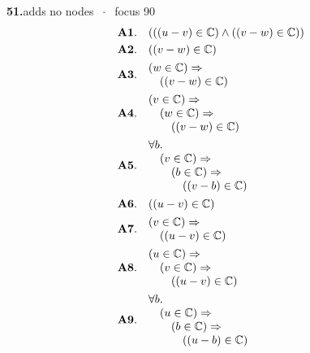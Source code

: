\documentclass[11pt]{article}
\theoremstyle{plain}
\newcommand{\fit}[1]{\resizebox{\ifdim\width>\linewidth\linewidth\else\width\fi}{!}{#1}}
\begin{document}
\medskip\noindent\textbf{51.}\quad \fit{\texttt{(ass)}}\hfill{\small adds no nodes $\;\cdot\;$ focus 90}\\[2pt]
\begin{align*}
  \mathbf{A1.}\quad & (((u - v) \in \mathbb{C}) \wedge ((v - w) \in \mathbb{C})) \\
  \mathbf{A2.}\quad & ((v - w) \in \mathbb{C}) \\
  \mathbf{A3.}\quad & \begin{array}{@{}l@{}} (w \in \mathbb{C}) \Rightarrow  \\ \quad ((v - w) \in \mathbb{C}) \end{array} \\
  \mathbf{A4.}\quad & \begin{array}{@{}l@{}} (v \in \mathbb{C}) \Rightarrow  \\ \quad (w \in \mathbb{C}) \Rightarrow  \\ \quad \quad ((v - w) \in \mathbb{C}) \end{array} \\
  \mathbf{A5.}\quad & \begin{array}{@{}l@{}} \forall b. \\ \quad (v \in \mathbb{C}) \Rightarrow  \\ \quad \quad (b \in \mathbb{C}) \Rightarrow  \\ \quad \quad \quad ((v - b) \in \mathbb{C}) \end{array} \\
  \mathbf{A6.}\quad & ((u - v) \in \mathbb{C}) \\
  \mathbf{A7.}\quad & \begin{array}{@{}l@{}} (v \in \mathbb{C}) \Rightarrow  \\ \quad ((u - v) \in \mathbb{C}) \end{array} \\
  \mathbf{A8.}\quad & \begin{array}{@{}l@{}} (u \in \mathbb{C}) \Rightarrow  \\ \quad (v \in \mathbb{C}) \Rightarrow  \\ \quad \quad ((u - v) \in \mathbb{C}) \end{array} \\
  \mathbf{A9.}\quad & \begin{array}{@{}l@{}} \forall b. \\ \quad (u \in \mathbb{C}) \Rightarrow  \\ \quad \quad (b \in \mathbb{C}) \Rightarrow  \\ \quad \quad \quad ((u - b) \in \mathbb{C}) \end{array} \\

\end{align*}
\end{document}

